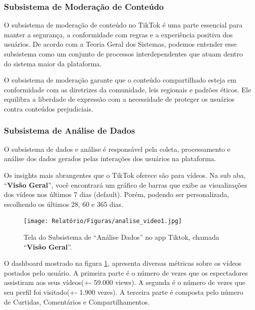 \subsubsection{Subsistema de Moderação de Conteúdo}


O subsistema de moderação de conteúdo no TikTok é uma parte essencial para manter a segurança, a conformidade com regras e a experiência positiva dos usuários. De acordo com a Teoria Geral dos Sistemas, podemos entender esse subsistema como um conjunto de processos interdependentes que atuam dentro do sistema maior da plataforma. \vskip0.3cm

O subsistema de moderação garante que o conteúdo compartilhado esteja em conformidade com as diretrizes da comunidade, leis regionais e padrões éticos. Ele equilibra a liberdade de expressão com a necessidade de proteger os usuários contra conteúdos prejudiciais.







\newpage
\subsubsection{Subsistema de Análise de Dados}

O subsistema de dados e análise é responsável pela coleta, processamento e análise dos dados gerados pelas interações dos usuários na plataforma.\vskip0.3cm


Os insights mais abrangentes que o TikTok oferece são para vídeos. Na sub aba, “\textbf{Visão Geral}”, você encontrará um gráfico de barras que exibe as visualizações dos vídeos nos últimos 7 dias (default). Porém, podendo ser personalizada, escolhendo os últimos 28, 60 e 365 dias.


\begin{figure}[H]
    \centering
    \texttt{[image: Relatório/Figuras/analise\_video1.jpg]}
    \caption{Tela do Subsistema de “Análise Dados” no app Tiktok, chamada “\textbf{Visão Geral}”.}
    \label{fig:enter-label2} 
\end{figure}

O dashboard mostrado na figura \ref{fig:enter-label2}, apresenta diversas métricas sobre os vídeos postados pelo usuário. A primeira parte é o número de vezes que os espectadores assistiram aos seus vídeos(+- 59.000 views). A segunda é o número de vezes que seu perfil foi visitado(+- 1.900 vezes). A terceira parte é composta pelo número de Curtidas, Comentários e Compartilhamentos.

